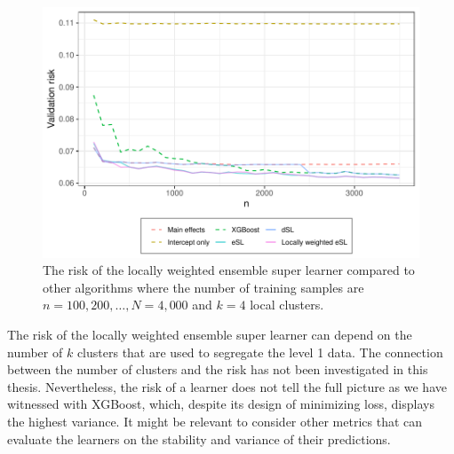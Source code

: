 \documentclass[./main.tex]{subfiles}
\begin{document}
\begin{figure}[H]
    \centering
    \includegraphics[width=\textwidth]{figures/losses_esl_lw_s22.pdf}
    \caption{The risk of the locally weighted ensemble super learner compared to other algorithms where the number of training samples are $ n = 100, 200, \dots , N = 4,000 $ and $ k = 4 $ local clusters.}
    \label{fig:losses_esl_lw}
\end{figure}
The risk of the locally weighted ensemble super learner can depend on the number of $ k $ clusters that are used to segregate the level 1 data. The connection between the number of clusters and the risk has not been investigated in this thesis. Nevertheless, the risk of a learner does not tell the full picture as we have witnessed with XGBoost, which, despite its design of minimizing loss, displays the highest variance. It might be relevant to consider other metrics that can evaluate the learners on the stability and variance of their predictions. 
\end{document}
